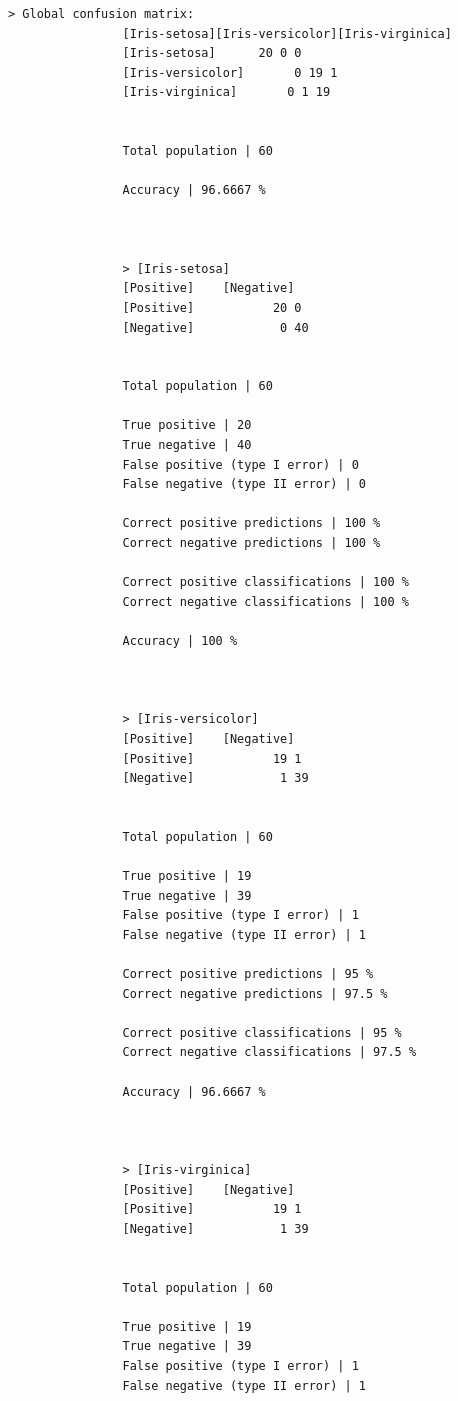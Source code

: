 \documentclass{classrep}
\begin{document}
{{{\begin{lstlisting}
> Global confusion matrix:
                [Iris-setosa][Iris-versicolor][Iris-virginica]
                [Iris-setosa]      20 0 0
                [Iris-versicolor]       0 19 1
                [Iris-virginica]       0 1 19


                Total population | 60

                Accuracy | 96.6667 %



                > [Iris-setosa]
                [Positive]    [Negative]
                [Positive]           20 0
                [Negative]            0 40


                Total population | 60

                True positive | 20
                True negative | 40
                False positive (type I error) | 0
                False negative (type II error) | 0

                Correct positive predictions | 100 %
                Correct negative predictions | 100 %

                Correct positive classifications | 100 %
                Correct negative classifications | 100 %

                Accuracy | 100 %



                > [Iris-versicolor]
                [Positive]    [Negative]
                [Positive]           19 1
                [Negative]            1 39


                Total population | 60

                True positive | 19
                True negative | 39
                False positive (type I error) | 1
                False negative (type II error) | 1

                Correct positive predictions | 95 %
                Correct negative predictions | 97.5 %

                Correct positive classifications | 95 %
                Correct negative classifications | 97.5 %

                Accuracy | 96.6667 %



                > [Iris-virginica]
                [Positive]    [Negative]
                [Positive]           19 1
                [Negative]            1 39


                Total population | 60

                True positive | 19
                True negative | 39
                False positive (type I error) | 1
                False negative (type II error) | 1


\end{lstlisting}}}}
\end{document}
